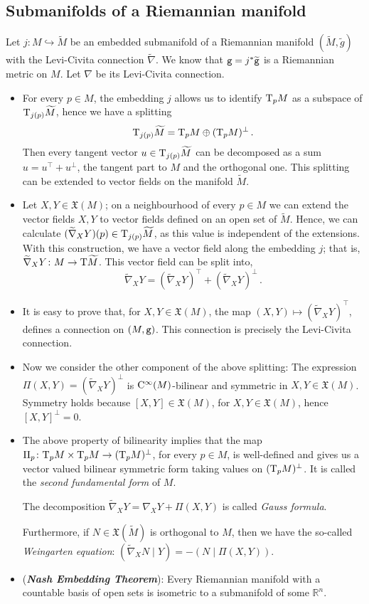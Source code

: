 \documentclass[12pt]{report}
\def\vf{\mathfrak X}
\def\Real{\mathbb{R}}
\def\Tan{{\rm T}}
\def\Cinfty{{\rm C}^\infty}
\begin{document}
\subsection{Submanifolds of a Riemannian manifold}


Let ${\mathit j}\colon M\hookrightarrow\widetilde{M}$ 
be an embedded submanifold of a Riemannian manifold 
$(\widetilde{M},\widetilde{g})$ with the Levi-Civita connection 
$\widetilde{\nabla}$. We know that ${\tt g}=j^*\widetilde{\tt g}$ 
is a Riemannian metric on $M$. Let $\nabla$ be its Levi-Civita connection.

\begin{itemize}
  \item 
For every $p\in M$, the embedding ${\mathit j}$ allows us to identify 
$\Tan_p M$ as a subspace of $\Tan_{j(p)}\widetilde M$, 
hence we have a splitting
$$
\Tan_{j(p)}\widetilde M=\Tan_p M\oplus (\Tan_p M)^\perp \,.
$$
Then every tangent vector $u\in\Tan_{j(p)}\widetilde M$ 
can be decomposed as a sum  $u=u^\top+u^\perp$, 
the tangent part to $M$ and the orthogonal one. This splitting can be extended to vector fields on the manifold $\widetilde M$. 
  \item
Let $X,Y\in\vf(M)$; on a neighbourhood of every $p\in M$ 
we can extend the vector fields $X,Y$ to vector fields 
defined on an open set of $\widetilde M$. 
Hence, we can calculate $(\widetilde{\nabla}_XY)(p)\in\Tan_{j(p)}\widetilde M$, 
as this value is independent of the extensions. 
With this construction, we have a vector field along the embedding ${\mathit j}$; 
that is, $\widetilde{\nabla}_XY\colon M\to \Tan\widetilde M$. 
This vector field can be split into,
$$
\widetilde{\nabla}_XY=(\widetilde{\nabla}_XY)^\top+(\widetilde{\nabla}_XY)^\perp \,.
$$
   \item
It is easy to prove that, for $X,Y\in\vf(M)$, the map $(X,Y)\mapsto(\widetilde{\nabla}_XY)^\top$, 
 defines a connection on $(M,{\tt g})$. 
This connection is precisely the Levi-Civita connection. 
  \item
Now we consider the other component of the above splitting: 
The expression $\Pi(X,Y)=(\widetilde{\nabla}_XY)^\perp$ is 
$\Cinfty(M)$-bilinear and symmetric in $X,Y\in\vf(M)$. 
Symmetry holds because $[X,Y]\in\vf(M)$, for $X,Y\in\vf(M)$, hence $[X,Y]^\perp=0$. 
  \item
The above property of bilinearity implies that
the map $\Pi_p\colon\Tan_p M\times\Tan_p M\to(\Tan_p M)^\perp$, for every $p\in M$,
is well-defined and gives us a vector valued bilinear symmetric form 
taking values on $(\Tan_p M)^\perp$. 
It is called the {\sl second fundamental form} of $M$.
  
The decomposition $\widetilde{\nabla}_XY=\nabla_XY+\Pi(X,Y)$ is called {\sl Gauss formula}.
  
Furthermore, if $N\in\vf(\widetilde M)$ is orthogonal to $M$, 
then we have the so-called {\sl Weingarten equation}: 
$(\widetilde{\nabla}_XN\mid Y)=-(N\mid\Pi(X,Y))$.
  \item
({\sl \textbf{Nash Embedding Theorem\/}}): Every Riemannian manifold 
with a countable basis of open sets is isometric 
to a submanifold of some $\Real^n$.
  \end{itemize}
\end{document}

